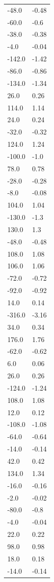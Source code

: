 \begin{longtable}{ll}
-48.0 & -0.48 \\
-60.0 & -0.6 \\
-38.0 & -0.38 \\
-4.0 & -0.04 \\
-142.0 & -1.42 \\
-86.0 & -0.86 \\
-134.0 & -1.34 \\
26.0 & 0.26 \\
114.0 & 1.14 \\
24.0 & 0.24 \\
-32.0 & -0.32 \\
124.0 & 1.24 \\
-100.0 & -1.0 \\
78.0 & 0.78 \\
-28.0 & -0.28 \\
-8.0 & -0.08 \\
104.0 & 1.04 \\
-130.0 & -1.3 \\
130.0 & 1.3 \\
-48.0 & -0.48 \\
108.0 & 1.08 \\
106.0 & 1.06 \\
-72.0 & -0.72 \\
-92.0 & -0.92 \\
14.0 & 0.14 \\
-316.0 & -3.16 \\
34.0 & 0.34 \\
176.0 & 1.76 \\
-62.0 & -0.62 \\
6.0 & 0.06 \\
26.0 & 0.26 \\
-124.0 & -1.24 \\
108.0 & 1.08 \\
12.0 & 0.12 \\
-108.0 & -1.08 \\
-64.0 & -0.64 \\
-14.0 & -0.14 \\
42.0 & 0.42 \\
134.0 & 1.34 \\
-16.0 & -0.16 \\
-2.0 & -0.02 \\
-80.0 & -0.8 \\
-4.0 & -0.04 \\
22.0 & 0.22 \\
98.0 & 0.98 \\
18.0 & 0.18 \\
-14.0 & -0.14 \\

\end{longtable}
